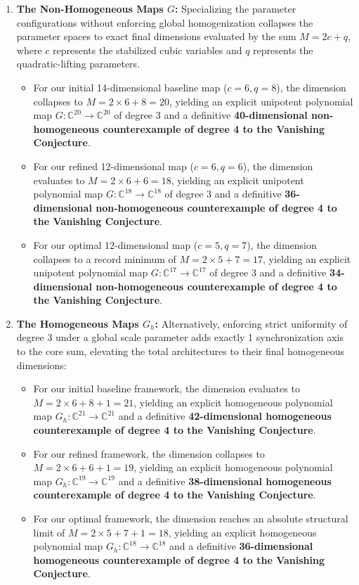 \documentclass[11pt,a4paper]{article}
\begin{document}
\begin{enumerate}
    \item \textbf{The Non-Homogeneous Maps $G$:} Specializing the parameter configurations without enforcing global homogenization collapses the parameter spaces to exact final dimensions evaluated by the sum $M = 2c + q$, where $c$ represents the stabilized cubic variables and $q$ represents the quadratic-lifting parameters.
    \begin{itemize}
        \item For our initial 14-dimensional baseline map ($c=6, q=8$), the dimension collapses to $M = 2 \times 6 + 8 = 20$, yielding an explicit unipotent polynomial map $G: \mathbb{C}^{20} \to \mathbb{C}^{20}$ of degree 3 and a definitive \textbf{40-dimensional non-homogeneous counterexample of degree 4 to the Vanishing Conjecture}.
        \item For our refined 12-dimensional map ($c=6, q=6$), the dimension evaluates to $M = 2 \times 6 + 6 = 18$, yielding an explicit unipotent polynomial map $G: \mathbb{C}^{18} \to \mathbb{C}^{18}$ of degree 3 and a definitive \textbf{36-dimensional non-homogeneous counterexample of degree 4 to the Vanishing Conjecture}.
        \item For our optimal 12-dimensional map ($c=5, q=7$), the dimension collapses to a record minimum of $M = 2 \times 5 + 7 = 17$, yielding an explicit unipotent polynomial map $G: \mathbb{C}^{17} \to \mathbb{C}^{17}$ of degree 3 and a definitive \textbf{34-dimensional non-homogeneous counterexample of degree 4 to the Vanishing Conjecture}.
    \end{itemize}
    
    \item \textbf{The Homogeneous Maps $G_h$:} Alternatively, enforcing strict uniformity of degree 3 under a global scale parameter adds exactly 1 synchronization axis to the core sum, elevating the total architectures to their final homogeneous dimensions:
    \begin{itemize}
        \item For our initial baseline framework, the dimension evaluates to $M = 2 \times 6 + 8 + 1 = 21$, yielding an explicit homogeneous polynomial map $G_h: \mathbb{C}^{21} \to \mathbb{C}^{21}$ and a definitive \textbf{42-dimensional homogeneous counterexample of degree 4 to the Vanishing Conjecture}.
        \item For our refined framework, the dimension collapses to $M = 2 \times 6 + 6 + 1 = 19$, yielding an explicit homogeneous polynomial map $G_h: \mathbb{C}^{19} \to \mathbb{C}^{19}$ and a definitive \textbf{38-dimensional homogeneous counterexample of degree 4 to the Vanishing Conjecture}.
        \item For our optimal framework, the dimension reaches an absolute structural limit of $M = 2 \times 5 + 7 + 1 = 18$, yielding an explicit homogeneous polynomial map $G_h: \mathbb{C}^{18} \to \mathbb{C}^{18}$ and a definitive \textbf{36-dimensional homogeneous counterexample of degree 4 to the Vanishing Conjecture}.
    \end{itemize}
\end{enumerate}
\end{document}
